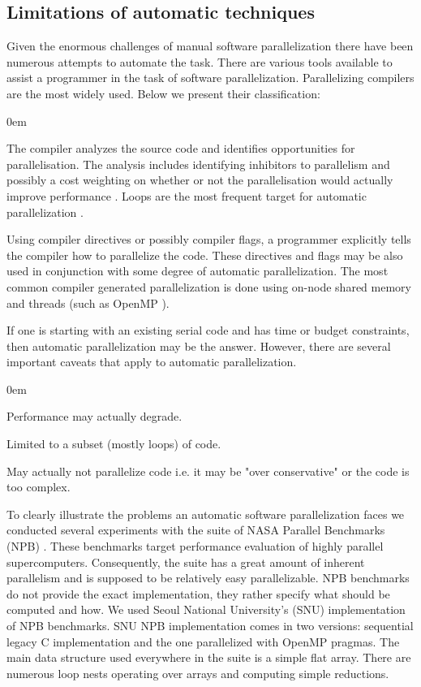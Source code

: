 \subsection{Limitations of automatic techniques}
\label{backgrnd_challenges_automatic}
\quad Given the enormous challenges of manual software parallelization there have been numerous attempts to automate the task. There are various tools available to assist a programmer in the task of software parallelization. Parallelizing compilers \cite{llvm-compiler-infrastructure}\cite{icc-compiler} are the most widely used. Below we present their classification:
\begin{description}[style=unboxed,leftmargin=0cm,noitemsep]
\itemsep0em
\item[Fully Automatic] The compiler analyzes the source code and identifies opportunities for parallelisation. The analysis includes identifying inhibitors to parallelism and possibly a cost weighting on whether or not the parallelisation would actually improve performance \cite{Kennedy:2001:OCM:502981}. Loops are the most frequent target for automatic parallelization \cite{Bacon:1994:CTH:197405.197406}.
\item[Programmer Directed] Using compiler directives or possibly compiler flags, a programmer explicitly tells the compiler how to parallelize the code. These directives and flags may be also used in conjunction with some degree of automatic parallelization. The most common compiler generated parallelization is done using on-node shared memory and threads (such as OpenMP \cite{Dagum:1998:OIA:615255.615542}).
\end{description}
\quad If one is starting with an existing serial code and has time or budget constraints, then automatic parallelization may be the answer. However, there are several important caveats that apply to automatic parallelization.
\begin{description}[style=unboxed,leftmargin=0cm]
\itemsep0em
\item[Performance] Performance may actually degrade.
\item[Limitations] Limited to a subset (mostly loops) of code.
\item[Effectiveness] May actually not parallelize code i.e. it may be "over conservative" or the code is too complex.
\end{description}
\quad To clearly illustrate the problems an automatic software parallelization faces we conducted several experiments with the suite of NASA Parallel Benchmarks (NPB) \cite{nasa-parallel-benchmarks}. These benchmarks target performance evaluation of highly parallel supercomputers. Consequently, the suite has a great amount of inherent parallelism and is supposed to be relatively easy parallelizable. NPB benchmarks do not provide the exact implementation, they rather specify what should be computed and how. We used Seoul National University's (SNU) implementation \cite{snu-npb-benchmarks} of NPB benchmarks. SNU NPB implementation comes in two versions: sequential legacy C implementation and the one parallelized with OpenMP pragmas. The main data structure used everywhere in the suite is a simple flat array. There are numerous loop nests operating over arrays and computing simple reductions.\newline\null
